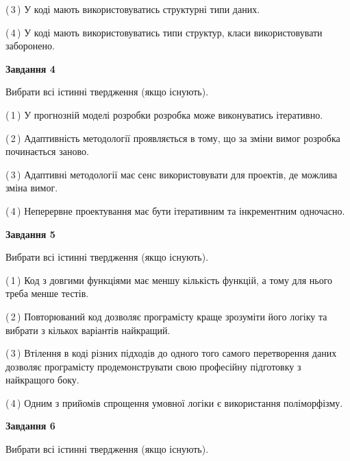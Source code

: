 \documentclass[10pt, ukrainian]{article}
\begin{document}
{\begin {large}
(\,3\,) У коді мають використовуватись структурні типи даних. %



(\,4\,) У коді мають використовуватись типи структур, класи використовувати заборонено. %


{\begin {center}\textbf{Завдання 4}\end {center}}\par
Вибрати всі істинні твердження (якщо існують).\par
\vspace{2mm}



(\,1\,) У прогнозній моделі розробки розробка може виконуватись ітеративно. %



(\,2\,) Адаптивність методології проявляється в тому, що за зміни вимог розробка починається заново. %



(\,3\,) Адаптивні методології має сенс використовувати для проектів, де можлива зміна вимог. %



(\,4\,) Неперервне проектування має бути ітеративним та інкрементним одночасно. %


{\begin {center}\textbf{Завдання 5}\end {center}}\par
Вибрати всі істинні твердження (якщо існують).\par
\vspace{2mm}



(\,1\,) Код з довгими функціями має меншу кількість функцій, а тому для нього треба менше тестів. %



(\,2\,) Повторюваний код дозволяє програмісту краще зрозуміти його логіку та вибрати з кількох варіантів найкращий. %



(\,3\,) Втілення в коді різних підходів до одного того самого перетворення даних дозволяє програмісту продемонструвати свою професійну підготовку з найкращого боку. %



(\,4\,) Одним з прийомів спрощення умовної логіки є використання поліморфізму. %

\newpage

{\begin {center}\textbf{Завдання 6}\end {center}}\par
Вибрати всі істинні твердження (якщо існують).\par
\vspace{2mm}




\end{large}}
\end{document}
